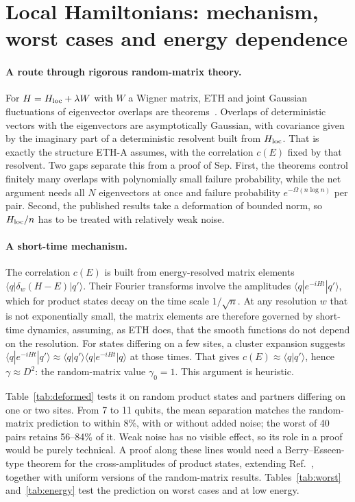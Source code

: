 \documentclass[11pt]{article}
\theoremstyle{definition}
\theoremstyle{remark}
\begin{document}
\section{Local Hamiltonians: mechanism, worst cases and energy dependence}
\label{sec:toward}

\paragraph{A route through rigorous random-matrix theory.} For $H=H_{\rm loc}+\lambda W$ with $W$ a Wigner matrix, ETH and joint Gaussian fluctuations of eigenvector overlaps are theorems~\cite{CES2021,Benigni2020,CEHK2023,BenigniCipolloni2024}. Overlaps of deterministic vectors with the eigenvectors are asymptotically Gaussian, with covariance given by the imaginary part of a deterministic resolvent built from $H_{\rm loc}$. That is exactly the structure ETH-A assumes, with the correlation $c(E)$ fixed by that resolvent.
Two gaps separate this from a proof of $\mathrm{Sep}$. First, the theorems control finitely many overlaps with polynomially small failure probability, while the net argument needs all $N$ eigenvectors at once and failure probability $e^{-\Omega(n\log n)}$ per pair. Second, the published results take a deformation of bounded norm, so $H_{\rm loc}/n$ has to be treated with relatively weak noise.

\paragraph{A short-time mechanism.} The correlation $c(E)$ is built from energy-resolved matrix elements $\langle q|\delta_w(H-E)|q'\rangle$. Their Fourier transforms involve the amplitudes $\langle q|e^{-iHt}|q'\rangle$, which for product states decay on the time scale $1/\sqrt n$. At any resolution $w$ that is not exponentially small, the matrix elements are therefore governed by short-time dynamics, assuming, as ETH does, that the smooth functions do not depend on the resolution.
For states differing on a few sites, a cluster expansion suggests $\langle q|e^{-iHt}|q'\rangle\approx\langle q|q'\rangle\langle q|e^{-iHt}|q\rangle$ at those times. That gives $c(E)\approx\langle q|q'\rangle$, hence $\gamma\approx D^2$: the random-matrix value $\gamma_0=1$. This argument is heuristic.

Table~\ref{tab:deformed} tests it on random product states and partners differing on one or two sites. From 7 to 11 qubits, the mean separation matches the random-matrix prediction to within 8\%, with or without added noise; the worst of 40 pairs retains 56--84\% of it. Weak noise has no visible effect, so its role in a proof would be purely technical.
A proof along these lines would need a Berry--Esseen-type theorem for the cross-amplitudes of product states, extending Ref.~\cite{BCG2015}, together with uniform versions of the random-matrix results. Tables~\ref{tab:worst} and~\ref{tab:energy} test the prediction on worst cases and at low energy.
\end{document}
